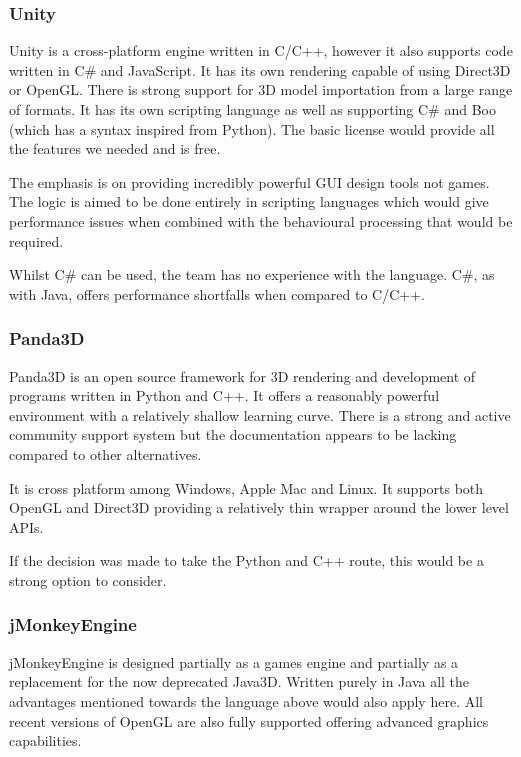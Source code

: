 \subsubsection{Unity}

Unity is a cross-platform engine written in C/C++, however it also
supports code written in C\# and JavaScript. It has its own rendering
capable of using Direct3D or OpenGL. There is strong support for 3D
model importation from a large range of formats. It has its own scripting
language as well as supporting C\# and Boo (which has a syntax inspired
from Python). The basic license would provide all the features we
needed and is free.

The emphasis is on providing incredibly powerful
GUI design tools not games. The logic is aimed to be done
entirely in scripting languages which would give performance issues
when combined with the behavioural processing that would be required.

Whilst C\# can be used, the team has no experience with the language. C\#, as with
Java, offers performance shortfalls when compared to C/C++.


\subsubsection{Panda3D}

Panda3D is an open source framework for 3D rendering and development
of programs written in Python and C++. It offers a reasonably powerful
environment with a relatively shallow learning curve. There is a strong
and active community support system but the documentation appears
to be lacking compared to other alternatives.

It is cross platform among Windows, Apple Mac and Linux.
It supports both OpenGL and Direct3D providing a relatively thin wrapper
around the lower level APIs.

If the decision was made to take the Python and C++ route, this would be a strong
option to consider.


\subsubsection{jMonkeyEngine}

jMonkeyEngine is designed partially as a games engine and partially as a
replacement for the now deprecated Java3D. Written purely in Java
all the advantages mentioned towards the language above would also
apply here. All recent versions of OpenGL are also fully supported
offering advanced graphics capabilities.

